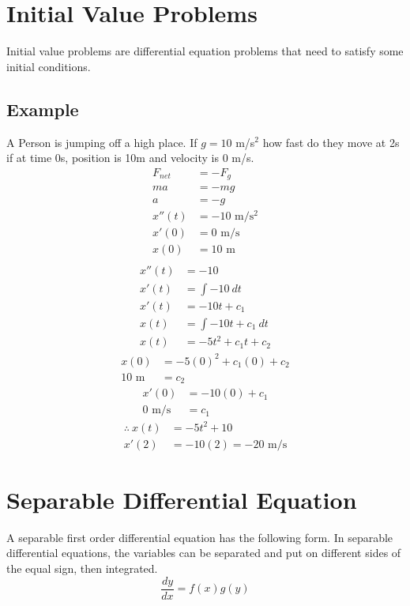 \documentclass{article}
\theoremstyle{mytheoremstyle}
\theoremstyle{mytheoremstyle}
\theoremstyle{myproblemstyle}
\begin{document}
    \section*{Initial Value Problems}
    Initial value problems are differential equation problems that need to
    satisfy some initial conditions.

    \subsection*{Example}
    A Person is jumping off a high place. If $g=10$ m/s$^2$ how fast do they move
    at 2s if at time 0s, position is 10m and velocity is 0 m/s.
    \begin{align*}
        F_{net} &= -F_g \\
        ma &= -mg \\
        a &= -g \\
        x''(t) &= -10 \text{ m}/\text{s}^2 \\
        x'(0) &= 0 \text{ m}/\text{s} \\
        x(0) &= 10 \text{ m} \\
    \end{align*}
    \begin{align*}
        x''(t) &= -10 \\
        x'(t) &= \int -10 \ dt \\
        x'(t) &= -10t + c_1 \\
        x(t) &= \int -10t + c_1 \ dt \\
        x(t) &= -5t^2 + c_1t + c_2
    \end{align*}
    \begin{align*}
        x(0) &= -5(0)^2 + c_1(0) + c_2 \\
        10\text{ m} &= c_2
    \end{align*}
    \begin{align*}
        x'(0) &= -10(0) + c_1 \\
        0\text{ m/s} &= c_1
    \end{align*}
    \begin{align*}
        \therefore\ x(t) &= -5t^2 + 10 \\
        x'(2) &= -10(2) = -20 \text{ m/s}
    \end{align*}

    \section*{Separable Differential Equation}
    A separable first order differential equation has the following form.
    In separable differential equations, the variables can be separated and put
    on different sides of the equal sign, then integrated.
    \[
        \frac{dy}{dx} = f(x)g(y)
    \]
\end{document}
